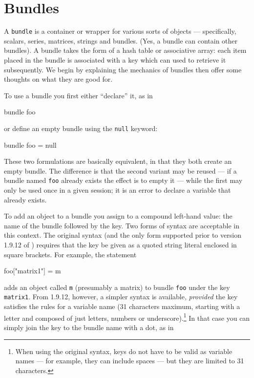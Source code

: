 \section{Bundles}
\label{sec:Bundles}

A \texttt{bundle} is a container or wrapper for various sorts of
objects --- specifically, scalars, series, matrices, strings and
bundles. (Yes, a bundle can contain other bundles). A bundle takes the
form of a hash table or associative array: each item placed in the
bundle is associated with a key which can used to retrieve it
subsequently. We begin by explaining the mechanics of bundles then
offer some thoughts on what they are good for.

To use a bundle you first either ``declare'' it, as in
%
\begin{code}
bundle foo
\end{code}
%
or define an empty bundle using the \texttt{null} keyword:
%
\begin{code}
bundle foo = null
\end{code}
%
These two formulations are basically equivalent, in that they both
create an empty bundle. The difference is that the second variant
may be reused --- if a bundle named \texttt{foo} already exists the
effect is to empty it --- while the first may only be used once in
a given  session; it is an error to declare a variable that
already exists. 

To add an object to a bundle you assign to a compound left-hand value:
the name of the bundle followed by the key. Two forms of syntax are
acceptable in this context. The original syntax (and the only form
supported prior to version 1.9.12 of ) requires that the
key be given as a quoted string literal enclosed in square brackets.
For example, the statement

\begin{code}
foo["matrix1"] = m
\end{code}

adds an object called \texttt{m} (presumably a matrix) to bundle
\texttt{foo} under the key \texttt{matrix1}. From  1.9.12,
however, a simpler syntax is available, \emph{provided} the key
satisfies the rules for a  variable name (31 characters
maximum, starting with a letter and composed of just letters, numbers
or underscore).\footnote{When using the original syntax, keys do not
  have to be valid as variable names --- for example, they can include
  spaces --- but they are limited to 31 characters.}  In that case you
can simply join the key to the bundle name with a dot, as in

